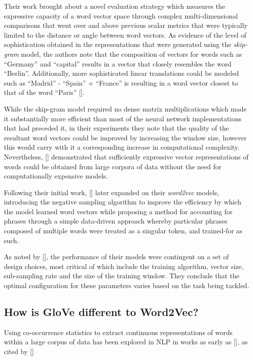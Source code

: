 \documentclass[12pt, a4paper]{report}
\theoremstyle{definition}
\theoremstyle{definition}%
\theoremstyle{definition}%
\theoremstyle{definition}%
\theoremstyle{definition}%
\theoremstyle{definition}%
\renewcommand{\cite}[1]{[\citealp{#1}]}
\begin{document}
Their work brought about a novel evaluation strategy which measures the expressive capacity of a word vector space through complex multi-dimensional comparisons that went over and above previous scalar metrics that were typically limited to the distance or angle between word vectors. As evidence of the level of sophistication obtained in the representations that were generated using the \textit{skip-gram} model, the authors note that the composition of vectors for words such as \enquote{Germany} and \enquote{capital} results in a vector that closely resembles the word \enquote{Berlin}. Additionally, more sophisticated linear translations could be modeled such as \enquote{Madrid} - \enquote{Spain} + \enquote{France} is resulting in a word vector closest to that of the word \enquote{Paris} \cite{mikolov2013c}.

While the skip-gram model required no dense matrix multiplications which made it substantially more efficient than most of the neural network implementations that had preceded it, in their experiments they note that the quality of the resultant word vectors could be improved by increasing the window size, however this would carry with it a corresponding increase in computational complexity. Nevertheless, \cite{mikolov2013} demonstrated that sufficiently expressive vector representations of words could be obtained from large corpora of data without the need for computationally expensive models.

Following their initial work, \cite{mikolov2013b} later expanded on their \textit{word2vec} models, introducing the negative sampling algorithm to improve the efficiency by which the model learned word vectors while proposing a method for accounting for phrases through a simple data-driven approach whereby particular phrases composed of multiple words were treated as a singular token, and trained-for as such.

As noted by \cite{mikolov2013}, the performance of their models were contingent on a set of design choices, most critical of which include the training algorithm, vector size, sub-sampling rate and the size of the training window. They conclude that the optimal configuration for these parameters varies based on the task being tackled.

\subsection{How is GloVe different to Word2Vec?}
Using co-occurrence statistics to extract continuous representations of words within a large corpus of data has been explored in NLP in works as early as \cite{rumelhart1988}, as cited by \cite{bojanowski2017}
\end{document}
